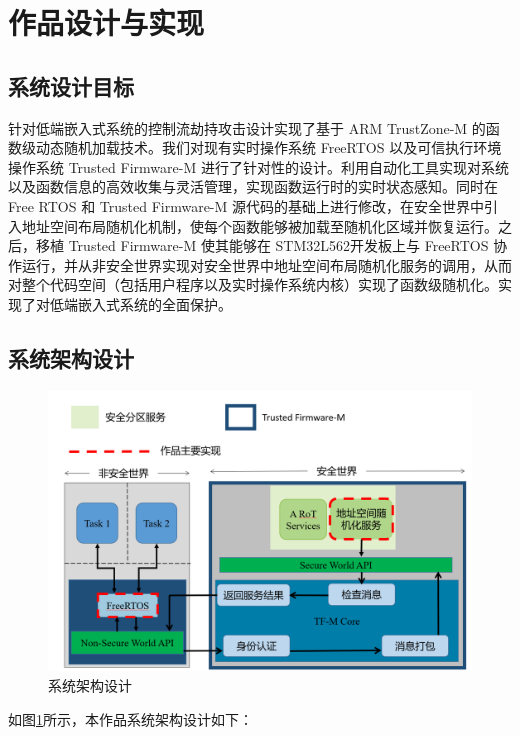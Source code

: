 \documentclass[UTF8,12pt,a4paper,twoside]{ctexart}
\numberwithin{figure}{section}
\begin{document}
\section{作品设计与实现}
\subsection{系统设计目标}
\par 针对低端嵌入式系统的控制流劫持攻击设计实现了基于 ARM TrustZone-M 的函数级动态随机加载技术。我们对现有实时操作系统 FreeRTOS 以及可信执行环境操作系统 Trusted Firmware-M 进行了针对性的设计。利用自动化工具实现对系统以及函数信息的高效收集与灵活管理，实现函数运行时的实时状态感知。同时在 Free RTOS 和 Trusted Firmware-M 源代码的基础上进行修改，在安全世界中引入地址空间布局随机化机制，使每个函数能够被加载至随机化区域并恢复运行。之后，移植 Trusted Firmware-M 使其能够在 STM32L562开发板上与 FreeRTOS 协作运行，并从非安全世界实现对安全世界中地址空间布局随机化服务的调用，从而对整个代码空间（包括用户程序以及实时操作系统内核）实现了函数级随机化。实现了对低端嵌入式系统的全面保护。
\subsection{系统架构设计}
\begin{figure}[H]
    \centering
    \includegraphics[scale=0.3]{graph/arc.png}
    \caption{系统架构设计}
    \label{fig:system_architecture}
\end{figure}
\par 如图\ref{fig:system_architecture}所示，本作品系统架构设计如下：
\end{document}
